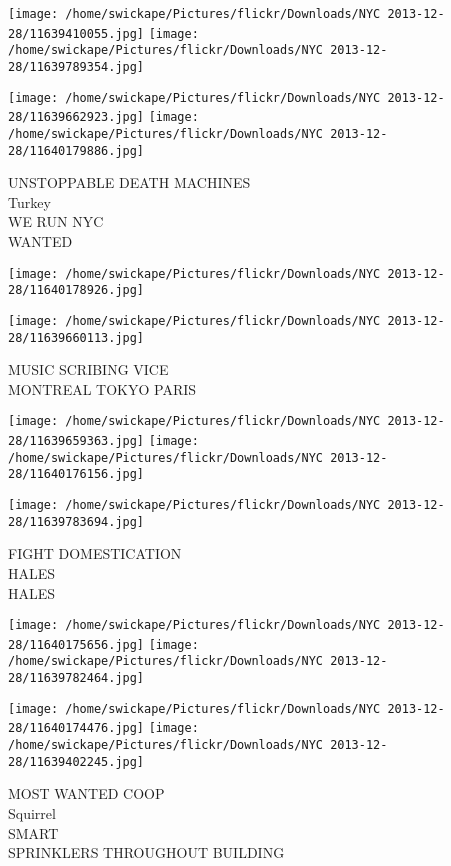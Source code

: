 \documentclass[10pt,letterpaper]{article}
\begin{document}
\texttt{[image: /home/swickape/Pictures/flickr/Downloads/NYC 2013-12-28/11639410055.jpg]}
\texttt{[image: /home/swickape/Pictures/flickr/Downloads/NYC 2013-12-28/11639789354.jpg]}

\texttt{[image: /home/swickape/Pictures/flickr/Downloads/NYC 2013-12-28/11639662923.jpg]}
\texttt{[image: /home/swickape/Pictures/flickr/Downloads/NYC 2013-12-28/11640179886.jpg]}

UNSTOPPABLE DEATH MACHINES\\
Turkey\\
WE RUN NYC\\
WANTED\\
\pagebreak

\texttt{[image: /home/swickape/Pictures/flickr/Downloads/NYC 2013-12-28/11640178926.jpg]}

\vspace{0.25in}
\texttt{[image: /home/swickape/Pictures/flickr/Downloads/NYC 2013-12-28/11639660113.jpg]}

MUSIC SCRIBING VICE\\
MONTREAL TOKYO PARIS\\
\pagebreak

\texttt{[image: /home/swickape/Pictures/flickr/Downloads/NYC 2013-12-28/11639659363.jpg]}
\texttt{[image: /home/swickape/Pictures/flickr/Downloads/NYC 2013-12-28/11640176156.jpg]}

\vspace{0.25in}
\texttt{[image: /home/swickape/Pictures/flickr/Downloads/NYC 2013-12-28/11639783694.jpg]}

FIGHT DOMESTICATION\\
HALES\\
HALES\\
\pagebreak

\texttt{[image: /home/swickape/Pictures/flickr/Downloads/NYC 2013-12-28/11640175656.jpg]}
\texttt{[image: /home/swickape/Pictures/flickr/Downloads/NYC 2013-12-28/11639782464.jpg]}

\texttt{[image: /home/swickape/Pictures/flickr/Downloads/NYC 2013-12-28/11640174476.jpg]}
\texttt{[image: /home/swickape/Pictures/flickr/Downloads/NYC 2013-12-28/11639402245.jpg]}

MOST WANTED COOP\\
Squirrel\\
SMART\\
SPRINKLERS THROUGHOUT BUILDING\\
\pagebreak
\end{document}
